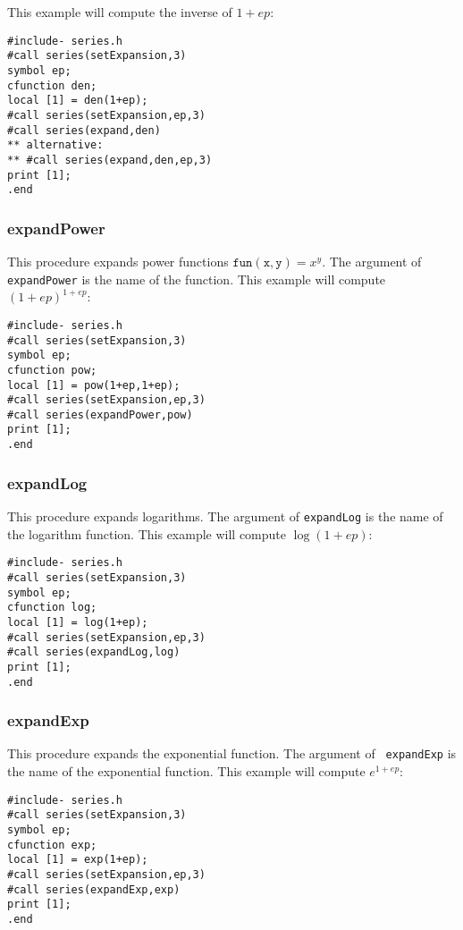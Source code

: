 \documentclass[titlepage]{article}
\begin{document}
This example will compute the
inverse of $1+ep$:
\begin{lstlisting}
#include- series.h
#call series(setExpansion,3)
symbol ep;
cfunction den;
local [1] = den(1+ep);
#call series(setExpansion,ep,3)
#call series(expand,den)
** alternative:
** #call series(expand,den,ep,3)
print [1];
.end
\end{lstlisting}

\subsubsection{expandPower}
\label{sec:pow_fun}

This procedure expands power functions $\mathtt{fun(x,y)} = x^y$. The
argument of {\tt expandPower} is the name of the function. This example
will compute $(1+ep)^{1+ep}$:
\begin{lstlisting}
#include- series.h
#call series(setExpansion,3)
symbol ep;
cfunction pow;
local [1] = pow(1+ep,1+ep);
#call series(setExpansion,ep,3)
#call series(expandPower,pow)
print [1];
.end
\end{lstlisting}

\subsubsection{expandLog}
\label{sec:log_fun}

This procedure expands logarithms. The argument of {\tt expandLog} is the name of the
logarithm function. This example will compute $\log(1+ep)$:
\begin{lstlisting}
#include- series.h
#call series(setExpansion,3)
symbol ep;
cfunction log;
local [1] = log(1+ep);
#call series(setExpansion,ep,3)
#call series(expandLog,log)
print [1];
.end
\end{lstlisting}

\subsubsection{expandExp}
\label{sec:exp_fun}

This procedure expands the exponential function. The argument of {\tt
expandExp} is the name of the exponential function. This example will
compute $e^{1+ep}$:
\begin{lstlisting}
#include- series.h
#call series(setExpansion,3)
symbol ep;
cfunction exp;
local [1] = exp(1+ep);
#call series(setExpansion,ep,3)
#call series(expandExp,exp)
print [1];
.end
\end{lstlisting}
\end{document}
